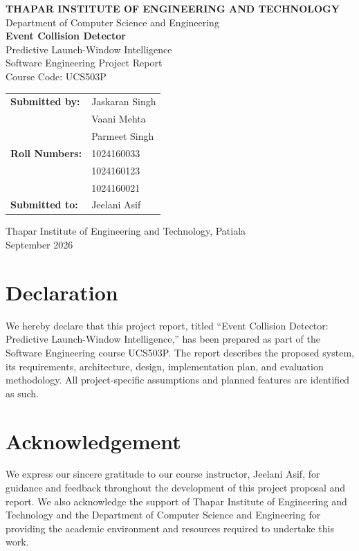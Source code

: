 \documentclass[12pt]{article}
\begin{document}
\begin{titlepage}
\begin{center}
\vspace*{1cm}
{\Large\textbf{THAPAR INSTITUTE OF ENGINEERING AND TECHNOLOGY}}\\[0.4em]
{\large Department of Computer Science and Engineering}\\[2cm]
{\Huge\textbf{Event Collision Detector}}\\[0.7em]
{\LARGE Predictive Launch-Window Intelligence}\\[2cm]
{\Large Software Engineering Project Report}\\[0.5em]
{\large Course Code: UCS503P}\\[2cm]
\begin{tabular}{ll}
\textbf{Submitted by:} & Jaskaran Singh\\
& Vaani Mehta\\
& Parmeet Singh\\[0.5em]
\textbf{Roll Numbers:} & 1024160033\\
& 1024160123\\
& 1024160021\\[0.5em]
\textbf{Submitted to:} & Jeelani Asif
\end{tabular}
\vfill
{\large Thapar Institute of Engineering and Technology, Patiala}\\
{\large September 2026}
\end{center}
\end{titlepage}

\section*{Declaration}
We hereby declare that this project report, titled ``Event Collision Detector: Predictive Launch-Window Intelligence,'' has been prepared as part of the Software Engineering course UCS503P. The report describes the proposed system, its requirements, architecture, design, implementation plan, and evaluation methodology. All project-specific assumptions and planned features are identified as such.

\section*{Acknowledgement}
We express our sincere gratitude to our course instructor, Jeelani Asif, for guidance and feedback throughout the development of this project proposal and report. We also acknowledge the support of Thapar Institute of Engineering and Technology and the Department of Computer Science and Engineering for providing the academic environment and resources required to undertake this work.
\end{document}
